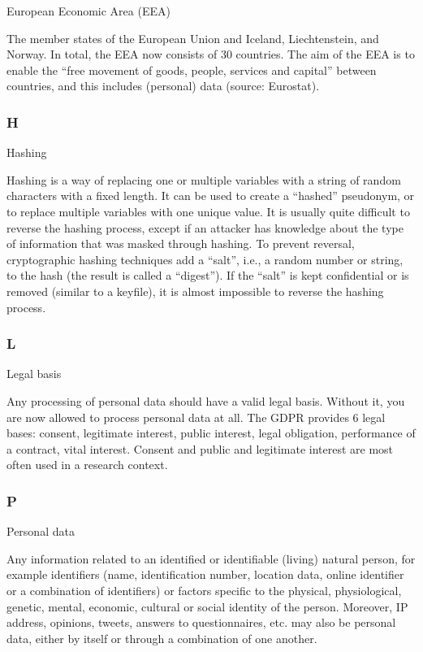 \documentclass[
]{book}
\begin{document}
European Economic Area (EEA)

The member states of the European Union and Iceland, Liechtenstein, and Norway. In total, the EEA now consists of
30 countries. The aim of the EEA is to enable the ``free movement of goods, people, services and capital'' between countries,
and this includes (personal) data (source:
Eurostat).

\hypertarget{h}{%
\subsubsection{H}\label{h}}

Hashing

Hashing is a way of replacing one or multiple variables with a string of
random characters with a fixed length. It can be used to create a ``hashed''
pseudonym, or to replace multiple variables with one unique value. It is
usually quite difficult to reverse the hashing process, except if an attacker
has knowledge about the type of information that was masked through hashing.
To prevent reversal, cryptographic hashing techniques add a ``salt'', i.e., a
random number or string, to the hash (the result is called a ``digest''). If
the ``salt'' is kept confidential or is removed (similar to a keyfile), it is
almost impossible to reverse the hashing process.

\hypertarget{l}{%
\subsubsection{L}\label{l}}

Legal basis

Any processing of personal data should have a valid legal basis. Without it, you are now allowed to process personal data at all.
The GDPR provides 6 legal bases: consent, legitimate interest, public interest, legal obligation, performance of a contract, vital
interest. Consent and public and legitimate interest are most often used in a research context.

\hypertarget{p}{%
\subsubsection{P}\label{p}}

Personal data

Any information related to an identified or identifiable (living) natural person, for example identifiers (name, identification number,
location data, online identifier or a combination of identifiers) or factors specific to the physical, physiological, genetic, mental,
economic, cultural or social identity of the person. Moreover, IP address, opinions, tweets, answers to questionnaires, etc. may also be
personal data, either by itself or through a combination of one another.
\end{document}
